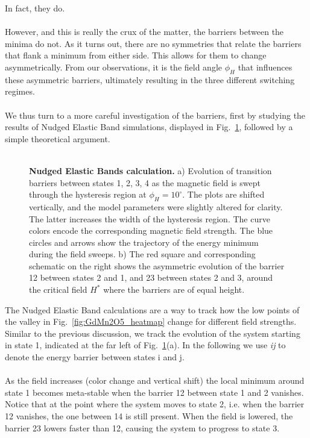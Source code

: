 In fact, they do.
\\\\
However, and this is really the crux of the matter, the barriers between the minima do not. As it turns out, there are no symmetries that relate the barriers that flank a minimum from either side.
This allows for them to change asymmetrically.
From our observations, it is the field angle $\phi_H$ that influences these asymmetric barriers, ultimately resulting in the three different switching regimes.
\\\\
We thus turn to a more careful investigation of the barriers, first by studying the results of Nudged Elastic Band simulations, displayed in Fig.~\ref{fig:GdMn2O5_neb}, followed by a simple theoretical argument.
\\\\
\begin{figure}[h]
    \caption{\label{fig:GdMn2O5_neb}{\bf Nudged Elastic Bands calculation.}
    a) Evolution of transition barriers between states 1, 2, 3, 4 as the magnetic field is swept through the hysteresis region at $\phi_H = 10^\circ$. The plots are shifted vertically, and the model parameters were slightly altered for clarity. The latter increases the width of the hysteresis region. The curve colors encode the corresponding magnetic field strength. The blue circles and arrows show the trajectory of the energy minimum during the field sweeps.
    b) The red square and corresponding schematic on the right shows the asymmetric evolution of the barrier 12 between states 2 and 1, and 23 between states 2 and 3, around the critical field $H^\ast$ where the barriers are of equal height.
    }
\end{figure}
%
The Nudged Elastic Band calculations are a way to track how the low points of the valley in Fig.~\ref{fig:GdMn2O5_heatmap} change for different field strengths.
Similar to the previous discussion, we track the evolution of the system starting in state 1, indicated at the far left of Fig.~\ref{fig:GdMn2O5_neb}(a).
In the following we use {\it ij} to denote the energy barrier between states i and j.
\\\\
As the field increases (color change and vertical shift) the local minimum around state 1 becomes meta-stable when the barrier 12 between state 1 and 2 vanishes.
Notice that at the point where the system moves to state 2, i.e. when the barrier 12 vanishes, the one between 14 is still present.
When the field is lowered, the barrier 23 lowers faster than 12, causing the system to progress to state 3.
